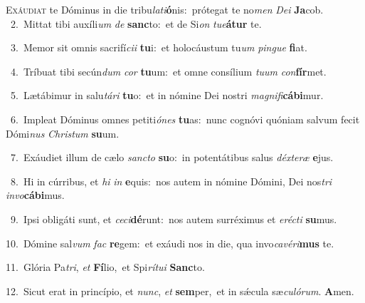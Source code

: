 \lettrine{\initial\textcolor{\initialcolor}{E}}{xáudiat} te Dóminus in die tribu\-\textit{la}\-\textit{ti}\textbf{ó}nis:~\star prótegat te no\textit{men} \textit{De}\-\textit{i} \textbf{Ja}\-cob.\\
{\numbfont\textcolor{\numbcolor}{~2.}}~Mittat tibi auxíli\textit{um} \textit{de} \textbf{sanc}\-to:~\star et de Si\textit{on} \textit{tu}\-\textit{e}\textbf{á}\textbf{tur} te.\par
{\numbfont\textcolor{\numbcolor}{~3.}}~Memor sit omnis sacrifí\-\textit{ci}\-\textit{i} \textbf{tu}\-i:~\star et holocáustum tu\textit{um} \textit{pin}\-\textit{gue} \textbf{fi}\-at.\par
{\numbfont\textcolor{\numbcolor}{~4.}}~Tríbuat tibi secún\textit{dum} \textit{cor} \textbf{tu}\-um:~\star et omne consílium \textit{tu}\-\textit{um} \textit{con}\-\textbf{fír}met.\par
{\numbfont\textcolor{\numbcolor}{~5.}}~Lætábimur in salu\-\textit{tá}\-\textit{ri} \textbf{tu}\-o:~\star et in nómine Dei nostri \textit{ma}\-\textit{gni}\textit{fi}\textbf{cá}\textbf{bi}mur.\par
{\numbfont\textcolor{\numbcolor}{~6.}}~Impleat Dóminus omnes petiti\-\textit{ó}\-\textit{nes} \textbf{tu}\-as:~\star nunc cognóvi quóniam salvum fecit Dómi\textit{nus} \textit{Chris}\-\textit{tum} \textbf{su}\-um.\par
{\numbfont\textcolor{\numbcolor}{~7.}}~Exáudiet illum de cælo \textit{sanc}\-\textit{to} \textbf{su}\-o:~\star in potentátibus salus \textit{déx}\-\textit{te}\textit{ræ} \textbf{e}\-jus.\par
{\numbfont\textcolor{\numbcolor}{~8.}}~Hi in cúrribus, et \textit{hi} \textit{in} \textbf{e}\-quis:~\star nos autem in nómine Dómini, Dei nos\textit{tri} \textit{in}\-\textit{vo}\textbf{cá}\textbf{bi}mus.\par
{\numbfont\textcolor{\numbcolor}{~9.}}~Ipsi obligáti sunt, et \textit{ce}\-\textit{ci}\textbf{dé}runt:~\star nos autem surréximus et \textit{e}\-\textit{réc}\textit{ti} \textbf{su}\-mus.\par
{\numbfont\textcolor{\numbcolor}{10.}}~Dómine sal\textit{vum} \textit{fac} \textbf{re}\-gem:~\star et exáudi nos in die, qua invo\-\textit{ca}\-\textit{vé}\textit{ri}\textbf{mus} te.\par
{\numbfont\textcolor{\numbcolor}{11.}}~Glória Pa\-\textit{tri}\-, \textit{et} \textbf{Fí}\-lio,~\star et Spi\-\textit{rí}\-\textit{tu}\textit{i} \textbf{Sanc}\-to.\par
{\numbfont\textcolor{\numbcolor}{12.}}~Sicut erat in princípio, et \textit{nunc}\-, \textit{et} \textbf{sem}\-per,~\star et in sǽcula sæ\-\textit{cu}\-\textit{ló}\textit{rum}. \textbf{A}\-men.\par
